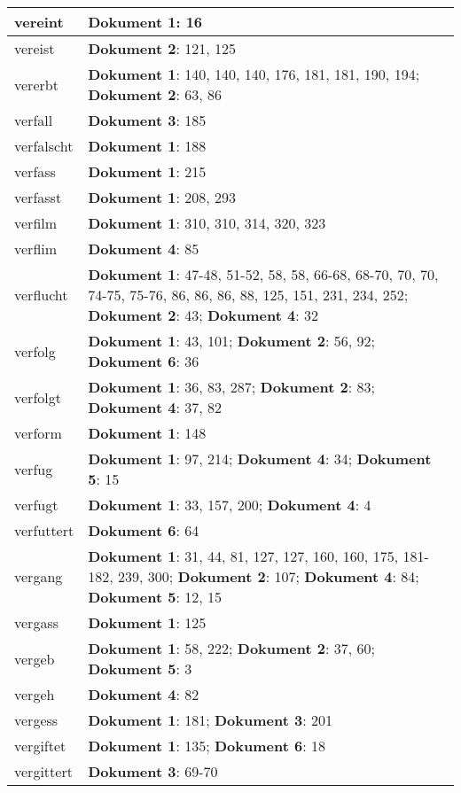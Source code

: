 \documentclass[a5paper]{article}
\begin{document}
\begin{longtable}[l]{|l|p{3in}|}
\hline
vereint & \textbf{Dokument 1}: 16 \\
\hline
vereist & \textbf{Dokument 2}: 121, 125 \\
\hline
vererbt & \textbf{Dokument 1}: 140, 140, 140, 176, 181, 181, 190, 194; \textbf{Dokument 2}: 63, 86 \\
\hline
verfall & \textbf{Dokument 3}: 185 \\
\hline
verfalscht & \textbf{Dokument 1}: 188 \\
\hline
verfass & \textbf{Dokument 1}: 215 \\
\hline
verfasst & \textbf{Dokument 1}: 208, 293 \\
\hline
verfilm & \textbf{Dokument 1}: 310, 310, 314, 320, 323 \\
\hline
verflim & \textbf{Dokument 4}: 85 \\
\hline
verflucht & \textbf{Dokument 1}: 47-48, 51-52, 58, 58, 66-68, 68-70, 70, 70, 74-75, 75-76, 86, 86, 86, 88, 125, 151, 231, 234, 252; \textbf{Dokument 2}: 43; \textbf{Dokument 4}: 32 \\
\hline
verfolg & \textbf{Dokument 1}: 43, 101; \textbf{Dokument 2}: 56, 92; \textbf{Dokument 6}: 36 \\
\hline
verfolgt & \textbf{Dokument 1}: 36, 83, 287; \textbf{Dokument 2}: 83; \textbf{Dokument 4}: 37, 82 \\
\hline
verform & \textbf{Dokument 1}: 148 \\
\hline
verfug & \textbf{Dokument 1}: 97, 214; \textbf{Dokument 4}: 34; \textbf{Dokument 5}: 15 \\
\hline
verfugt & \textbf{Dokument 1}: 33, 157, 200; \textbf{Dokument 4}: 4 \\
\hline
verfuttert & \textbf{Dokument 6}: 64 \\
\hline
vergang & \textbf{Dokument 1}: 31, 44, 81, 127, 127, 160, 160, 175, 181-182, 239, 300; \textbf{Dokument 2}: 107; \textbf{Dokument 4}: 84; \textbf{Dokument 5}: 12, 15 \\
\hline
vergass & \textbf{Dokument 1}: 125 \\
\hline
vergeb & \textbf{Dokument 1}: 58, 222; \textbf{Dokument 2}: 37, 60; \textbf{Dokument 5}: 3 \\
\hline
vergeh & \textbf{Dokument 4}: 82 \\
\hline
vergess & \textbf{Dokument 1}: 181; \textbf{Dokument 3}: 201 \\
\hline
vergiftet & \textbf{Dokument 1}: 135; \textbf{Dokument 6}: 18 \\
\hline
vergittert & \textbf{Dokument 3}: 69-70 \\

\end{longtable}
\end{document}
